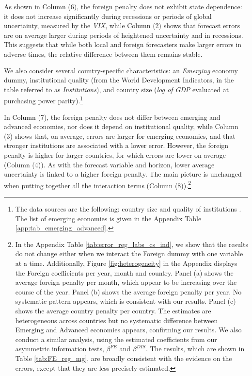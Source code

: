 As shown in Column (6), the foreign penalty does not exhibit state dependence: it does not increase significantly during recessions or periods of global uncertainty, measured by the \textit{VIX}, while Column (2) shows that forecast errors are on average larger during periods of heightened uncertainty and in recessions. This suggests that while both local and foreign forecasters make larger errors in adverse times, the relative difference between them remains stable.

We also consider several country-specific characteristics: an \textit{Emerging} economy dummy, institutional quality (from the World Development Indicators, in the table referred to as \textit{Institutions}), and country size (\textit{log of GDP }evaluated at purchasing power parity).\footnote{The data sources are the following: country size \citep{cpigravity22} and quality of institutions \citep{wdi22}. The list of emerging economies is given in the Appendix Table \ref{app:tab_emerging_advanced}.}



In Column (7), the foreign penalty does not differ between emerging and advanced economies, nor does it depend on institutional quality, while Column (3) shows that, on average, errors are larger for emerging economies, and that stronger institutions are associated with a lower error. However, the foreign penalty is higher for larger countries, for which errors are lower on average (Column (4)). As with the forecast variable and horizon, lower average uncertainty is linked to a higher foreign penalty. The main picture is unchanged when putting together all the interaction terms (Column (8)).\footnote{In the Appendix Table \ref{tab:error_reg_labs_cs_ind}, we show that the results do not change either when we interact the Foreign dummy with one variable at a time. Additionally, Figure \ref{fig:heterogeneity} in the Appendix displays the Foreign coefficients per year, month and country. Panel (a) shows the average foreign penalty per month, which appear to be increasing over the course of the year. Panel (b) shows the average foreign penalty per year. No systematic pattern appears, which is consistent with our results. Panel (c) shows the average country penalty per country. The estimates are heterogeneous across countries but no systematic difference between Emerging and Advanced economies appears, confirming our results. We also conduct a similar analysis, using the estimated coefficients from our asymmetric information tests, $\beta^{FE}$ and $\beta^{DIS}$. The results, which are shown in Table \ref{tab:FE_reg_mg}, are broadly consistent with the evidence on the errors, except that they are less precisely estimated.}

